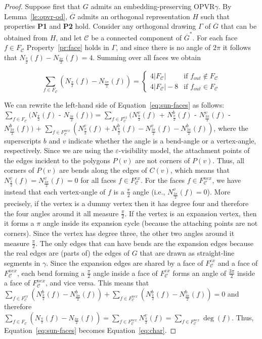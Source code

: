 \documentclass{article}
\newcommand{\ph}{\frac{\pi}{2}}
\newcommand{\pt}{\frac{3\pi}{2}}
\newcommand{\C}{\mathcal C}
\newcommand{\nh}{N_{\frac{\pi}{2}}}
\newcommand{\nt}{N_{\frac{3\pi}{2}}}
\newcommand{\opvr}{OPVR\xspace}
\newcommand{\bG}{\overline{G}}
\begin{document}
\begin{proof}
Suppose first that $G$ admits an embedding-preserving \opvr $\gamma$. By Lemma~\ref{le:opvr-od}, $\bG$ admits an orthogonal representation $H$ such that properties {\bf P1} and {\bf P2} hold. Consider any orthogonal drawing $\Gamma$ of $\bG$ that can be obtained from $H$, and let $\C$ be a connected component of $\bG^*$. For each face $f \in F_\C$ Property~\ref{pr:face} holds in $\Gamma$, and since there is no angle of $2\pi$ it follows that $\nh(f)-\nt(f)=4$. Summing over all faces we obtain

\begin{equation}\label{eq:sun-faces}
\sum_{f \in F_\C}(\nh(f)-\nt(f))=
\begin{cases}
    4|F_\C| & \text{if $f_{out} \not \in F_\C$} \\
    4|F_\C|-8 & \text{if $f_{out} \in F_\C$}
\end{cases}
\end{equation}

We can rewrite the left-hand side of Equation~\ref{eq:sun-faces} as follows: 
$\sum_{f \in F_\C}(\nh(f)$ - $\nt(f))$ = $\sum_{f \in F^{ex}_\C}(\nh^v(f)$ + $\nh^b(f)$ - $\nt^v(f)$ - $\nt^b(f))$ + $\sum_{f \in F^{nex}_\C}(\nh^v(f) + \nh^b(f) - \nt^v(f) - \nt^b(f))$, where the superscripts $b$ and $v$ indicate whether the angle is a bend-angle or a vertex-angle, respectively. Since we are using the $\varepsilon$-visibility model, the attachment points of the edges incident to the polygons $P(v)$ are not corners of $P(v)$. Thus, all corners of $P(v)$ are bends along the edges of $C(v)$, which means that $\nh^v(f)=\nt^v(f)=0$ for all faces $f \in F^{ex}_\C$. For the faces $f \in F^{nex}_\C$, we have instead that each vertex-angle of $f$ is a $\ph$ angle (i.e., $\nt^v(f)=0$). More precisely, if the vertex is a dummy vertex then it has degree four and therefore the four angles around it all measure $\ph$. If the vertex is an expansion vertex, then it forms a $\pi$ angle inside its expansion cycle (because the attaching points are not corners). Since the vertex has degree three, the other two angles around it measure $\ph$. The only edges that can have bends are the expansion edges because the real edges are (parts of) the edges of $G$ that are drawn as straight-line segments in $\gamma$. Since the expansion edges are shared by a face of $F^{ex}_\C$ and a face of $F^{nex}_\C$, each bend forming a $\ph$ angle inside a face of $F^{ex}_\C$ forms an angle of $\pt$ inside a face of $F^{nex}_\C$, and vice versa. This means that
$\sum_{f \in F^{ex}_\C}(\nh^b(f)-\nt^b(f))+\sum_{f \in F^{nex}_\C}(\nh^b(f)-\nt^b(f))=0$ and therefore $\sum_{f \in F_\C}(\nh(f)-\nt(f))=\sum_{f \in F^{nex}_\C}\nh^v(f)=\sum_{f \in F^{nex}_\C}\deg(f)$. Thus, Equation~\ref{eq:sun-faces} becomes Equation~\ref{eq:char}.


\end{proof}
\end{document}
